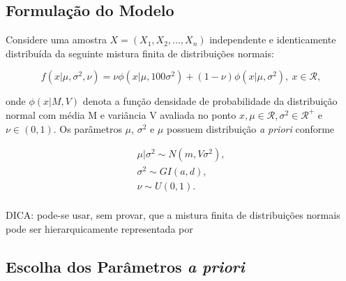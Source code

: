 \documentclass[12pt,reqno,a4paper,oneside, titlepage]{article}
\begin{document}
\subsection{Formulação do Modelo}\label{formulacao}


Considere uma amostra $X = (X_{1}, X_{2}, ..., X_{n})$ independente e identicamente distribuída da seguinte mistura finita de distribuições normais:

\begin{equation}\label{eq:dist_amostral}
f(x|\mu,\sigma^2,\nu)=\nu\phi(x|\mu,100\sigma^2)+(1-\nu)\phi(x|\mu,\sigma^2), \ x\in\mathcal{R},
\end{equation}

\noindent onde $\phi(x|M,V)$ denota a função densidade de probabilidade da distribuição normal com média M e variância V avaliada no ponto $x,\mu\in\mathcal{R},\sigma^2\in\mathcal{R^+}$ e $\nu\in(0,1)$. Os parâmetros $\mu$, $\sigma^2$ e $\mu$ possuem distribuição \textit{a priori} conforme


\begin{equation}\label{eq:priori}
\begin{split}
\mu|\sigma^2\sim{N}(m,V\sigma^2),\\
\sigma^2\sim{GI}(a,d),\\
\nu\sim{U}(0,1).\\
\end{split}
\end{equation}




DICA: pode-se usar, sem provar, que a mistura finita de distribuições normais pode ser hierarquicamente representada por 



\subsection{Escolha dos Parâmetros \textit{a priori}}\label{parametros}
\end{document}
